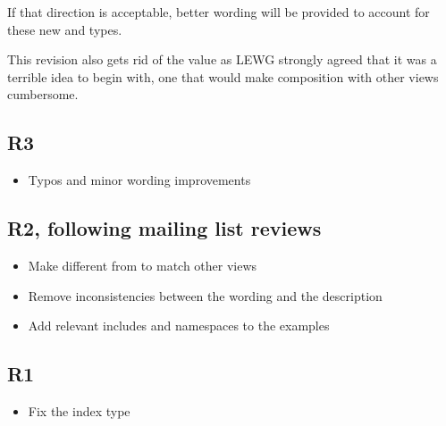 \documentclass{wg21}
\begin{document}
If that direction is acceptable, better wording will be provided to account for these new  and  types.

This revision also gets rid of the   value as LEWG strongly agreed that it was a terrible idea to begin with, one that would make composition with other views cumbersome.

\subsection{R3}

\begin{itemize}
    \item Typos and minor wording improvements
\end{itemize}

\subsection{R2, following mailing list reviews}
\begin{itemize}
    \item Make  different from   to match other views
    \item Remove inconsistencies between the wording and the description
    \item Add relevant includes and namespaces to the examples
\end{itemize}


\subsection{R1}
\begin{itemize}
\item Fix the index type
\end{itemize}
\end{document}
